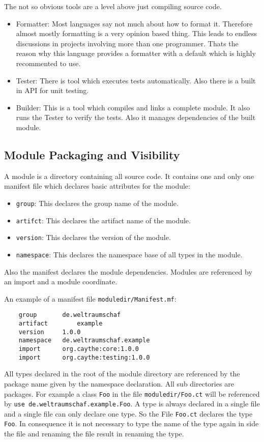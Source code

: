 \documentclass[a4paper,12pt]{article}
\begin{document}
The not so obvious tools are a level above just compiling source code.

\begin{itemize}
	\item Formatter: Most languages say not much about how to format it. Therefore almost mostly formatting is a very opinion based thing. This leads to endless discussions in projects involving more than one programmer. Thats the reason why this language provides a formatter with a default which is highly recommented to use.
	\item Tester: There is tool which executes tests automatically. Also there is a built in API for unit testing.
	\item Builder: This is a tool which compiles and links a complete module. It also runs the Tester to verify the tests. Also it manages dependencies of the built module.
\end{itemize}

\subsection{Module Packaging and Visibility}

A module is a directory containing all source code. It contains one and only one manifest file which declares basic attributes for the module:

\begin{itemize}
	\item \verb|group|: This declares the group name of the module.
 	\item \verb|artifct|: This declares the artifact name of the module.
 	\item \verb|version|: This declares the version of the module.
 	\item \verb|namespace|: This declares the namespace base of all types in the module.
\end{itemize}

Also the manifest declares the module dependencies. Modules are referenced by an import and a module coordinate.

An example of a manifest file \verb|moduledir/Manifest.mf|:
\begin{verbatim}
	group       de.weltraumschaf
	artifact	    example
	version     1.0.0
	namespace   de.weltraumschaf.example
	import      org.caythe:core:1.0.0
	import      org.caythe:testing:1.0.0
\end{verbatim}

All types declared in the root of the module directory are referenced by the package name given by the namespace declaration. All sub directories are packages. For example a class \verb|Foo| in the file \verb|moduledir/Foo.ct| will be referenced by \verb|use de.weltraumschaf.example.Foo|. A type is always declared in a single file and a single file can only declare one type. So the File \verb|Foo.ct| declares the type \verb|Foo|. In consequence it is not necessary to type the name of the type again in side the file and renaming the file result in renaming the type.
\end{document}
